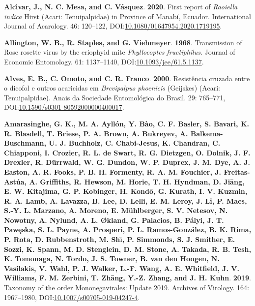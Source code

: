 \documentclass[12pt,final,CPage]{ufthesis}
\newlength{\cslhangindent}
\newenvironment{CSLReferences}[2] %
{%
	\setlength{\parindent}{0pt}
	\ifodd #1 \everypar{\setlength{\hangindent}{\cslhangindent}}\ignorespaces\fi
	\ifnum #2 > 0
	\setlength{\parskip}{#2\baselineskip}
	\fi
}%
{}
\begin{document}
{\begin{CSLReferences}{1}{0}
  \leavevmode{}%
  \textbf{Alcı́var, J., N. C. Mesa, and C. Vásquez}. \textbf{2020}. First report of {\emph{Raoiella indica}} {Hirst} ({Acari}: {Tenuipalpidae}) in {Province} of {Manab{í}}, {Ecuador}. International Journal of Acarology. 46: 120--122, DOI:\href{https://doi.org/10.1080/01647954.2020.1719195}{10.1080/01647954.2020.1719195}.

  \leavevmode{}%
  \textbf{Allington, W. B., R. Staples, and G. Viehmeyer}. \textbf{1968}. Transmission of {Rose rosette virus} by the eriophyid mite {\emph{Phyllocoptes fructiphilus}}. Journal of Economic Entomology. 61: 1137--1140, DOI:\href{https://doi.org/10.1093/jee/61.5.1137}{10.1093/jee/61.5.1137}.

  \leavevmode{}%
  \textbf{Alves, E. B., C. Omoto, and C. R. Franco}. \textbf{2000}. Resist{ê}ncia cruzada entre o dicofol e outros acaricidas em {\emph{Brevipalpus phoenicis}} ({Geijskes}) ({Acari}: {Tenuipalpidae}). Anais da Sociedade Entomol{ó}gica do Brasil. 29: 765--771, DOI:\href{https://doi.org/10.1590/s0301-80592000000400017}{10.1590/s0301-80592000000400017}.

  \leavevmode{}%
  \textbf{Amarasinghe, G. K., M. A. Ayllón, Y. Bào, C. F. Basler, S. Bavari, K. R. Blasdell, T. Briese, P. A. Brown, A. Bukreyev, A. Balkema-Buschmann, U. J. Buchholz, C. Chabi-Jesus, K. Chandran, C. Chiapponi, I. Crozier, R. L. de Swart, R. G. Dietzgen, O. Dolnik, J. F. Drexler, R. Dürrwald, W. G. Dundon, W. P. Duprex, J. M. Dye, A. J. Easton, A. R. Fooks, P. B. H. Formenty, R. A. M. Fouchier, J. Freitas-Astúa, A. Griffiths, R. Hewson, M. Horie, T. H. Hyndman, D. Jiāng, E. W. Kitajima, G. P. Kobinger, H. Kondō, G. Kurath, I. V. Kuzmin, R. A. Lamb, A. Lavazza, B. Lee, D. Lelli, E. M. Leroy, J. Lǐ, P. Maes, S.-Y. L. Marzano, A. Moreno, E. Mühlberger, S. V. Netesov, N. Nowotny, A. Nylund, A. L. Økland, G. Palacios, B. Pályi, J. T. Pawęska, S. L. Payne, A. Prosperi, P. L. Ramos-González, B. K. Rima, P. Rota, D. Rubbenstroth, M. Shı̄, P. Simmonds, S. J. Smither, E. Sozzi, K. Spann, M. D. Stenglein, D. M. Stone, A. Takada, R. B. Tesh, K. Tomonaga, N. Tordo, J. S. Towner, B. van den Hoogen, N. Vasilakis, V. Wahl, P. J. Walker, L.-F. Wang, A. E. Whitfield, J. V. Williams, F. M. Zerbini, T. Zhāng, Y.-Z. Zhang, and J. H. Kuhn}. \textbf{2019}. Taxonomy of the order {Mononegavirales}: Update 2019. Archives of Virology. 164: 1967--1980, DOI:\href{https://doi.org/10.1007/s00705-019-04247-4}{10.1007/s00705-019-04247-4}.


\end{CSLReferences}}
\end{document}
